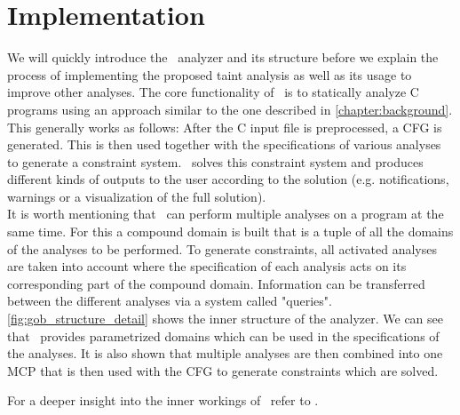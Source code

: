   \section{Implementation}
  We will quickly introduce the \gob\ analyzer and its structure before we explain the process of implementing the proposed taint analysis as well as its usage to improve other analyses. The core functionality of \gob\ is to statically analyze C programs using an approach similar to the one described in \autoref{chapter:background}. This generally works as follows: After the C input file is preprocessed, a \ac{CFG} is generated. This is then used together with the specifications of various analyses to generate a constraint system. \gob\ solves this constraint system and produces different kinds of outputs to the user according to the solution (e.g. notifications, warnings or a visualization of the full solution).\\
  It is worth mentioning that \gob\ can perform multiple analyses on a program at the same time. For this a compound domain is built that is a tuple of all the domains of the analyses to be performed. To generate constraints, all activated analyses are taken into account where the specification of each analysis acts on its corresponding part of the compound domain. Information can be transferred between the different analyses via a system called "queries".\\
  \autoref{fig:gob_structure_detail} shows the inner structure of the analyzer. We can see that \gob\ provides parametrized domains which can be used in the specifications of the analyses. It is also shown that multiple analyses are then combined into one MCP that is then used with the \ac{CFG} to generate constraints which are solved.
  
  For a deeper insight into the inner workings of \gob\ refer to \parencite{apinis2014frameworks}.
  
